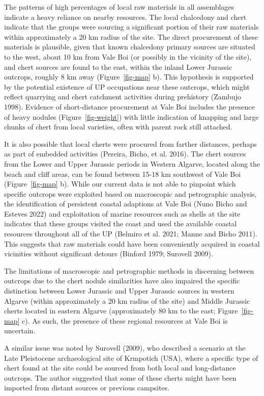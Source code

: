 \documentclass[
  a4paper,
  DIV=11,
  numbers=noendperiod]{scrreprt}
\begin{document}
The patterns of high percentages of local raw materials in all
assemblages indicate a heavy reliance on nearby resources. The local
chalcedony and chert indicate that the groups were sourcing a
significant portion of their raw materials within approximately a 20 km
radius of the site. The direct procurement of these materials is
plausible, given that known chalcedony primary sources are situated to
the west, about 10 km from Vale Boi (or possibly in the vicinity of the
site), and chert sources are found to the east, within the inland Lower
Jurassic outcrops, roughly 8 km away (Figure~\ref{fig-map} b). This
hypothesis is supported by the potential existence of UP occupations
near these outcrops, which might reflect quarrying and chert catchment
activities during prehistory (Zambujo 1998). Evidence of short-distance
procurement at Vale Boi includes the presence of heavy nodules
(Figure~\ref{fig-weight}) with little indication of knapping and large
chunks of chert from local varieties, often with parent rock still
attached.

It is also possible that local cherts were procured from farther
distances, perhaps as part of embedded activities (Pereira, Bicho, et
al. 2016). The chert sources from the Lower and Upper Jurassic periods
in Western Algarve, located along the beach and cliff areas, can be
found between 15-18 km southwest of Vale Boi (Figure~\ref{fig-map} b).
While our current data is not able to pinpoint which specific outcrops
were exploited based on macroscopic and petrographic analysis, the
identification of persistent coastal adaptions at Vale Boi (Nuno Bicho
and Esteves 2022) and exploitation of marine resources such as shells at
the site indicates that these groups visited the coast and used the
available coastal resources throughout all of the UP (Belmiro et al.
2021; Manne and Bicho 2011). This suggests that raw materials could have
been conveniently acquired in coastal vicinities without significant
detours (Binford 1979; Surovell 2009).

The limitations of macroscopic and petrographic methods in discerning
between outcrops due to the chert nodule similarities have also impaired
the specific distinction between Lower Jurassic and Upper Jurassic
sources in western Algarve (within approximately a 20 km radius of the
site) and Middle Jurassic cherts located in eastern Algarve
(approximately 80 km to the east; Figure~\ref{fig-map} c). As such, the
presence of these regional resources at Vale Boi is uncertain.

A similar issue was noted by Surovell (2009), who described a scenario
at the Late Pleistocene archaeological site of Krmpotich (USA), where a
specific type of chert found at the site could be sourced from both
local and long-distance outcrops. The author suggested that some of
these cherts might have been imported from distant sources or previous
campsites.
\end{document}
